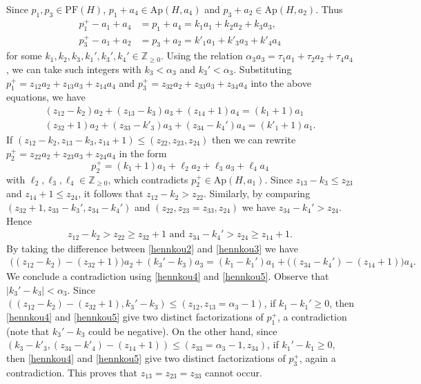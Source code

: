 \documentclass[12pt]{amsart}
\numberwithin{equation}{section}
\theoremstyle{definition}
\newcommand{\PF}{\mathrm{PF}}
\newcommand{\Ap}{\mathrm{Ap}}
\begin{document}
Since $p_1,p_3 \in \PF(H)$,
$p_1+a_4\in \Ap(H,a_4)$ and $p_3+a_2 \in \Ap(H,a_2)$. Thus
\begin{align*}
p_1^+-a_1+a_4&=p_1+a_4=k_1a_1+k_2a_2+k_3a_3,\\
p_3^+-a_1+a_2&=p_3+a_2=k'_1a_1+k'_3a_3+k'_4a_4
\end{align*}
for some $k_1,k_2,k_3,k_1',k_3',k_4' \in \mathbb Z_{\geq 0}$.
Using the relation $\alpha_3 a_3= \tau_1a_1+\tau_2 a_2+\tau_4a_4$,
we can take such integers with $k_3<\alpha_3$ and $k_3' <\alpha_3$.
Substituting $p_1^+=z_{12}a_2+z_{13}a_3+z_{14}a_4$ and $p_3^+=z_{32}a_2+z_{33}a_3+z_{34}a_4$ into the above equations, we have
\begin{align}
    \label{hennkou2}
    (z_{12}-k_2)a_2+(z_{13}-k_3)a_3+(z_{14}+1)a_4 =(k_1+1)a_1\\
    \label{hennkou3}
    (z_{32}+1)a_2+(z_{33}-k'_3)a_3+(z_{34}-k_4')a_4 =(k'_1+1)a_1.
    \end{align}
If $(z_{12}-k_2,z_{13}-k_3,z_{14}+1) \leq (z_{22},z_{23},z_{24})$ then we can rewrite $p_2^+=z_{22}a_2+z_{23}a_3+z_{24}a_4$ in the form
\[p_2^+=(k_1+1)a_1+\ell_2a_2+\ell_3a_3+\ell_4a_4\]
with $\ell_2,\ell_3,\ell_4 \in \mathbb Z_{\geq 0}$, which contradicts $p_2^+ \in \Ap(H,a_1)$.
Since $z_{13}-k_3\leq z_{23}$ and
$z_{14}+1\leq z_{24}$, it follows that $z_{12}-k_2>z_{22}$.
Similarly, by comparing $(z_{32}+1,z_{33}-k_3',z_{34}-k_4')$ and $(z_{22},z_{23}=z_{33},z_{24})$ we have $z_{34}-k_4' >z_{24}$.
Hence
\begin{align}
    \label{hennkou4}
    z_{12}-k_2 > z_{22} \geq z_{32}+1
    \text{ and } z_{34}-k_4' >z_{24} \geq z_{14}+1.
\end{align}
By taking the difference between \eqref{hennkou2} and \eqref{hennkou3} we have
\begin{align}
    \label{hennkou5}
    \big((z_{12}\!-\!k_2)\!-\!(z_{32}\!+\!1)\big)a_2
    \!+\!(k_3'\!-\!k_3)a_3\!=\!(k_1\!-\!k_1')a_1\!+\!\big( (z_{34}\!-\!k_4')\!-\!(z_{14}\!+\!1)\big)a_4.\end{align}
We conclude a contradiction using \eqref{hennkou4} and \eqref{hennkou5}.
Observe that $|k_3'-k_3|<\alpha_3$.
Since $((z_{12}-k_2)-(z_{32}+1),k_3'-k_3) \leq (z_{12},z_{13}=\alpha_3-1)$,
if $k_1-k_1'\geq0$, then \eqref{hennkou4} and \eqref{hennkou5}
give two distinct factorizations of $p_1^+$, a contradiction (note that $k_3'-k_3$ could be negative).
On the other hand,
since $(k_3-k'_3,(z_{34}-k'_4)-(z_{14}+1)) \leq (z_{33}=\alpha_3-1,z_{34})$,
if $k_1'-k_1\geq0$, then \eqref{hennkou4} and \eqref{hennkou5}
give two distinct factorizations of $p_3^+$, again a contradiction.
This proves that $z_{13}=z_{23}=z_{33}$ cannot occur.
\bigskip
\end{document}
